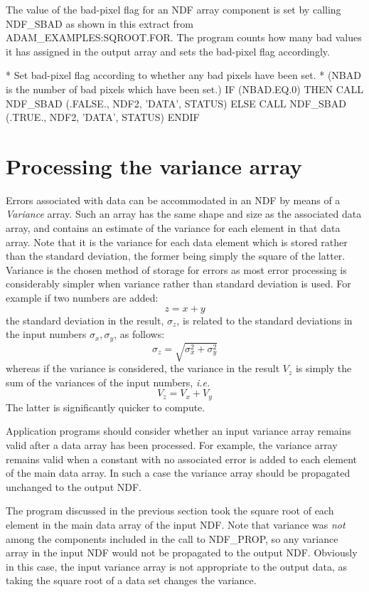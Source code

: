 \documentclass[twoside,11pt,nolof]{starlink}
\begin{document}
The value of the bad-pixel flag for an NDF array component
is set by calling NDF\_SBAD as shown in this extract
from ADAM\_EXAMPLES:SQROOT.FOR.  The program  counts how many bad values
it has assigned in the output array and sets the bad-pixel flag accordingly.
\begin{terminalv}
*   Set bad-pixel flag according to whether any bad pixels have been set.
*   (NBAD is the number of bad pixels which have been set.)
      IF (NBAD.EQ.0) THEN
         CALL NDF_SBAD (.FALSE., NDF2, 'DATA', STATUS)
      ELSE
         CALL NDF_SBAD (.TRUE., NDF2, 'DATA', STATUS)
      ENDIF
\end{terminalv}

\newpage
\section{Processing the variance array\label{variance}}

Errors associated with data can be accommodated in an NDF by means of a
{\sl Variance\/} array.
Such an array has the same shape and size
as the associated data array, and contains an estimate of the variance
for each element in that data array.
Note that it is the variance for each data element which is stored
rather than the standard deviation, the former being simply the square
of the latter.
Variance is the chosen method of storage for errors as
most error processing is
considerably simpler when  variance rather than standard deviation is used.
For example if two numbers are added:
$$z=x+y$$
the standard deviation in the result, $\sigma_z$, is related to the standard
deviations in the input numbers $\sigma_x,\sigma_y$, as follows:
$$\sigma_z=\sqrt{\sigma_x^2+\sigma_y^2}$$
whereas if the variance is considered, the variance in the result
$V_z$ is simply the sum of the variances of the input numbers, \textit{i.e.}
$$V_z=V_x+V_y$$
The latter is significantly quicker to compute.


Application programs should consider whether an input variance array
remains valid after a data array has been processed.
For example, the variance array remains valid when a
constant with no
associated error is added to each element of the main data array.
In such a case the
variance array should be propagated unchanged to the output NDF.

The program discussed in the previous section took the square root of each
element in the main data array of the input NDF.
Note that variance was {\sl not\/} among the components included in the
call to NDF\_PROP, so any variance array in the input NDF would not
be propagated to the output NDF.
Obviously in this case, the input variance array is not appropriate to the
output data, as taking the square root of a data set
changes the variance.
\end{document}
